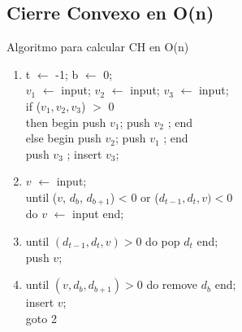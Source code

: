 \documentclass[aspectratio=169,xcolor=dvipsnames, t]{beamer}
\begin{document}
\begin{frame}{}
\begin{columns}
\begin{column}{0.45\textwidth}
\begin{figure}
      \end{figure}
    \end{column}
  \end{columns}
\end{frame}

\subsection{Cierre Convexo en O(n)}
\begin{frame}{Algoritmo para calcular CH en O(n)}
  \begin{center}
    \begin{enumerate}
      \footnotesize
    \item t $\leftarrow$ -1; b $\leftarrow$ 0;\\
      $v_{1}$ $\leftarrow$ input; $v_{2}$ $\leftarrow$ input; $v_{3}$ $\leftarrow$ input;\\
      if ($v_{1}, v_{2}, v_{3}$) $>$ 0\\
      \hspace*{0.5cm} then begin push $v_{1}$; push $v_{2}$ ; end \\
      \hspace*{0.5cm} else begin push $v_{2}$; push $v_{1}$ ; end \\
      push $v_{3}$ ; insert $v_{3}$; 
    \item $v$ $\leftarrow$ input;\\
      until ($v$, $d_{b}$, $d_{b+1}$) < 0 or ($d_{t-1}, d_{t}, v) < 0$ \\
      \hspace*{0.5cm} do $v$ $\leftarrow$ input end;  
    \item until $(d_{t-1}, d_{t}, v) > 0$ do pop $d_{t}$ end;\\
      push $v$;
    \item until $(v, d_{b}, d_{b+1}) > 0$ do remove $d_{b}$ end;\\ 
      insert $v$; \\
      goto 2\\
    \end{enumerate}
  \end{center}
\end{frame}
\end{document}
